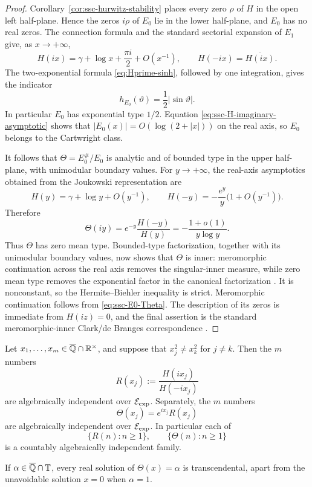 \begin{proof}
Corollary~\ref{cor:ssc-hurwitz-stability} places every zero \(\rho\) of
\(H\) in the open left half-plane.  Hence the zeros \(i\rho\) of \(E_0\)
lie in the lower half-plane, and \(E_0\) has no real zeros.  The connection
formula and the standard sectorial expansion of \(E_1\) give, as
\(x\to+\infty\),
\begin{equation}\label{eq:ssc-H-imaginary-asymptotic}
 H(ix)=\gamma+\log x+\frac{\pi i}{2}+O(x^{-1}),
 \qquad H(-ix)=\overline{H(ix)}.
\end{equation}
The two-exponential formula \eqref{eq:Hprime-sinh}, followed by one
integration, gives the indicator
\[
 h_{E_0}(\vartheta)=\frac12|\sin\vartheta|.
\]
In particular \(E_0\) has exponential type \(1/2\).  Equation
\eqref{eq:ssc-H-imaginary-asymptotic} shows that
\(|E_0(x)|=O(\log(2+|x|))\) on the real axis, so \(E_0\) belongs to the
Cartwright class.

It follows that \(\Theta=E_0^\#/E_0\) is analytic and of bounded type in
the upper half-plane, with unimodular boundary values.  For
\(y\to+\infty\), the real-axis asymptotics obtained from the Joukowski
representation are
\[
 H(y)=\gamma+\log y+O(y^{-1}),\qquad
 H(-y)=-\frac{e^y}{y}\bigl(1+O(y^{-1})\bigr).
\]
Therefore
\begin{equation}\label{eq:ssc-Theta-mean-type}
 \Theta(iy)=e^{-y}\frac{H(-y)}{H(y)}
 =-\frac{1+o(1)}{y\log y}.
\end{equation}
Thus \(\Theta\) has zero mean type.  Bounded-type factorization, together
with its unimodular boundary values, now shows that \(\Theta\) is inner:
meromorphic continuation across the real axis removes the singular-inner
measure, while zero mean type removes the exponential factor in the
canonical factorization \cite{deBranges1968,Clark1972}.  It is nonconstant,
so the Hermite--Biehler inequality is strict.
Meromorphic continuation follows from \eqref{eq:ssc-E0-Theta}.  The
description of its zeros is immediate from \(H(iz)=0\), and the final
assertion is the standard meromorphic-inner Clark/de Branges
correspondence \cite{Clark1972,deBranges1968}.
\end{proof}

\begin{theorem}
\label{thm:ssc-arithmetic-Clark}
Let \(x_1,\ldots,x_m\in\overline{\mathbb Q}\cap\mathbb R^\times\), and suppose that
\(x_j^2\ne x_k^2\) for \(j\ne k\).  Then the \(m\) numbers
\[
 R(x_j):=\frac{H(ix_j)}{H(-ix_j)}
\]
are algebraically independent over \(\mathcal E_{\mathrm{exp}}\).  Separately, the \(m\)
numbers
\[
 \Theta(x_j)=e^{ix_j}R(x_j)
\]
are algebraically independent over \(\mathcal E_{\mathrm{exp}}\).  In particular each of
\[
 \{R(n):n\geq1\},\qquad \{\Theta(n):n\geq1\}
\]
is a countably algebraically independent family.

If \(\alpha\in\overline{\mathbb Q}\cap\mathbb T\), every real solution of
\(\Theta(x)=\alpha\) is transcendental, apart from the unavoidable
solution \(x=0\) when \(\alpha=1\).
\end{theorem}

